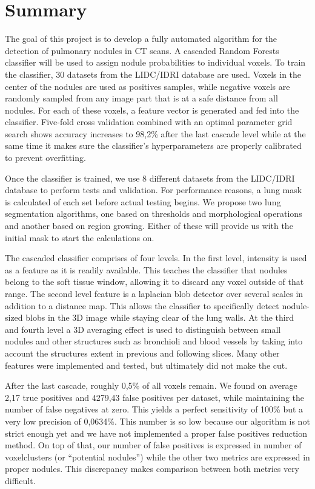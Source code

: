 \section*{Summary} 

The goal of this project is to develop a fully automated algorithm for the
detection of pulmonary nodules in CT scans. A cascaded Random Forests classifier
will be used to assign nodule probabilities to individual voxels. To train the
classifier, 30 datasets from the LIDC/IDRI database are used. Voxels in the
center of the nodules are used as positives samples, while negative voxels are
randomly sampled from any image part that is at a safe distance from all
nodules. For each of these voxels, a feature vector is generated and fed into
the classifier. Five-fold cross validation combined with an optimal parameter
grid search shows accuracy increases to 98,2\% after the last cascade level while
at the same time it makes sure the classifier's hyperparameters are properly
calibrated to prevent overfitting.

Once the classifier is trained, we use 8 different datasets from the LIDC/IDRI
database to perform tests and validation. For performance reasons, a lung mask
is calculated of each set before actual testing begins. We propose two lung
segmentation algorithms, one based on thresholds and morphological operations
and another based on region growing. Either of these will provide us with the
initial mask to start the calculations on.

The cascaded classifier comprises of four levels. In the first level, intensity
is used as a feature as it is readily available. This teaches the classifier
that nodules belong to the soft tissue window, allowing it to discard any voxel
outside of that range. The second level feature is a laplacian blob detector
over several scales in addition to a distance map. This allows the classifier to
specifically detect nodule-sized blobs in the 3D image while staying clear of
the lung walls. At the third and fourth level a 3D averaging effect is used to
distinguish between small nodules and other structures such as bronchioli and
blood vessels by taking into account the structures extent in previous and
following slices. Many other features were implemented and tested, but
ultimately did not make the cut.

After the last cascade, roughly 0,5\% of all voxels remain. We found on average
2,17 true positives and 4279,43 false positives per dataset, while maintaining
the number of false negatives at zero. This yields a perfect sensitivity of
100\% but a very low precision of 0,0634\%. This number is so low because our
algorithm is not strict enough yet and we have not implemented a proper false
positives reduction method. On top of that, our number of false positives is
expressed in number of voxelclusters (or ``potential nodules'') while the other
two metrics are expressed in proper nodules. This discrepancy makes comparison
between both metrics very difficult.

